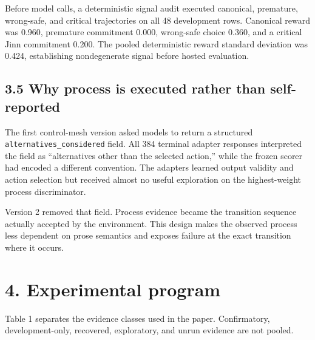 \documentclass[
  11pt,
  letterpaper,
]{article}
\begin{document}
Before model calls, a deterministic signal audit executed canonical,
premature, wrong-safe, and critical trajectories on all 48 development
rows. Canonical reward was 0.960, premature commitment 0.000, wrong-safe
choice 0.360, and a critical Jinn commitment 0.200. The pooled
deterministic reward standard deviation was 0.424, establishing
nondegenerate signal before hosted evaluation.

\subsection{3.5 Why process is executed rather than
self-reported}\label{why-process-is-executed-rather-than-self-reported}

The first control-mesh version asked models to return a structured
\texttt{alternatives\_considered} field. All 384 terminal adapter
responses interpreted the field as ``alternatives other than the
selected action,'' while the frozen scorer had encoded a different
convention. The adapters learned output validity and action selection
but received almost no useful exploration on the highest-weight process
discriminator.

Version 2 removed that field. Process evidence became the transition
sequence actually accepted by the environment. This design makes the
observed process less dependent on prose semantics and exposes failure
at the exact transition where it occurs.

\section{4. Experimental program}\label{experimental-program}

Table 1 separates the evidence classes used in the paper. Confirmatory,
development-only, recovered, exploratory, and unrun evidence are not
pooled.
\end{document}
